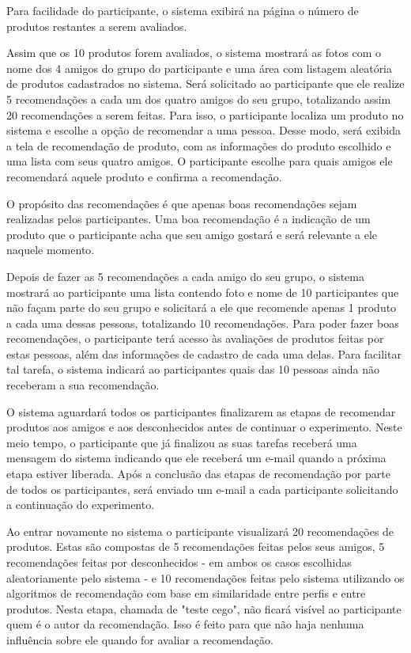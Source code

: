  Para facilidade do participante, o sistema exibirá na página o número de produtos restantes a serem avaliados.
 
 Assim que os 10 produtos forem avaliados, o sistema mostrará as fotos com o nome dos 4 amigos do grupo do participante e uma área com listagem aleatória de produtos cadastrados no sistema. Será solicitado ao participante que ele realize 5 recomendações a cada um dos quatro amigos do seu grupo, totalizando assim 20 recomendações a serem feitas. Para isso, o participante localiza um produto no sistema e escolhe a opção de recomendar a uma pessoa. Desse modo, será exibida a tela de recomendação de produto, com as informações do produto escolhido e uma lista com seus quatro amigos. O participante escolhe para quais amigos ele recomendará aquele produto e confirma a recomendação.
 
 O propósito das recomendações é que apenas boas recomendações sejam realizadas pelos participantes. Uma boa recomendação é a indicação de um produto que o participante acha que seu amigo gostará e será relevante a ele naquele momento.

 Depois de fazer as 5 recomendações a cada amigo do seu grupo, o sistema mostrará ao participante uma lista contendo foto e nome de 10 participantes que não façam parte do seu grupo e solicitará a ele que recomende apenas 1 produto a cada uma dessas pessoas, totalizando 10 recomendações. Para poder fazer boas recomendações, o participante terá acesso às avaliações de produtos feitas por estas pessoas, além das informações de cadastro de cada uma delas. Para facilitar tal tarefa, o sistema indicará ao participantes quais das 10 pessoas ainda não receberam a sua recomendação.

 O sistema aguardará todos os participantes finalizarem as etapas de recomendar produtos aos amigos e aos desconhecidos antes de continuar o experimento. Neste meio tempo, o participante que já finalizou as suas tarefas receberá uma mensagem do sistema indicando que ele receberá um e-mail quando a próxima etapa estiver liberada. Após a conclusão das etapas de recomendação por parte de todos os participantes, será enviado um e-mail a cada participante solicitando a continuação do experimento.
 
 Ao entrar novamente no sistema o participante visualizará 20 recomendações de produtos. Estas são compostas de 5 recomendações feitas pelos seus amigos, 5 recomendações feitas por desconhecidos - em ambos os casos escolhidas aleatoriamente pelo sistema - e 10 recomendações feitas pelo sistema utilizando os algoritmos de recomendação com base em similaridade entre perfis e entre produtos. Nesta etapa, chamada de "teste cego", não ficará visível ao participante quem é o autor da recomendação. Isso é feito para que não haja nenhuma influência sobre ele quando for avaliar a recomendação.
 
